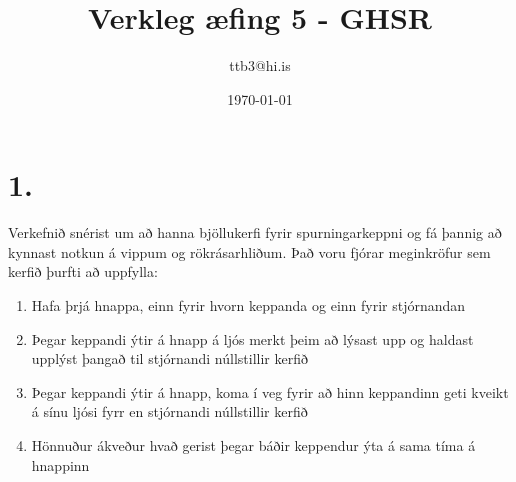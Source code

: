 \documentclass{article}
\title{Verkleg æfing 5 - GHSR}
\author{ttb3@hi.is}
\date{\today}
\begin{document}
\maketitle


\section*{1.}
Verkefnið snérist um að hanna bjöllukerfi fyrir spurningarkeppni og fá þannig að kynnast notkun á vippum og rökrásarhliðum.
Það voru fjórar meginkröfur sem kerfið þurfti að uppfylla:
\begin{enumerate}
    \item Hafa þrjá hnappa, einn fyrir hvorn keppanda og einn fyrir stjórnandan
    \item Þegar keppandi ýtir á hnapp á ljós merkt þeim að lýsast upp og haldast upplýst þangað til stjórnandi núllstillir kerfið
    \item Þegar keppandi ýtir á hnapp, koma í veg fyrir að hinn keppandinn geti kveikt á sínu ljósi fyrr en stjórnandi núllstillir kerfið
    \item Hönnuður ákveður hvað gerist þegar báðir keppendur ýta á sama tíma á hnappinn
\end{enumerate}
\end{document}
